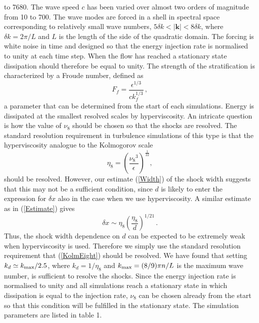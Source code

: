 \documentclass{jfm}
\newcommand{\kk}{\textbf{k}}
\newcommand{\kmax}{k_{\mbox{\scriptsize max}}}
\begin{document}
to 7680.
%
The wave speed $c$ has been varied over almost two orders of magnitude from 10
to 700. The wave modes are forced in a shell in spectral space corresponding to
relatively small wave numbers, $ 5 \delta k < |\kk| < 8 \delta k$, where $
\delta k = 2 \pi /L $ and $ L $ is the length of the side of the quadratic
domain. 
The forcing is white noise in time and designed so that the energy
injection rate is normalised to unity at each time step. When the flow has reached a stationary state dissipation should therefore be equal to unity. 
The strength of the stratification is characterized by a
Froude number, defined as
\begin{equation} \label{Fr}
F_f = \frac{\epsilon^{1/3}}{c k_f^{1/3}} \, ,
\end{equation}
a parameter that can be determined from the start of each simulations.
Energy is dissipated at the smallest resolved scales by hyperviscosity. An intricate question is how the value of $ \nu_{8} $ should be chosen so that the shocks are resolved. The standard resolution requirement in turbulence simulations of this type is that the hyperviscosity analogue to the Kolmogorov scale
\begin{equation}  \label{KolmEight}
\eta_{8} = \left( \frac{{\nu_8}^3}{\epsilon} \right)^{\frac{1}{22}},
\end{equation}
should be resolved. However, our estimate (\ref{Width}) of the shock width suggests that this may not be a sufficient condition, since $ d $ is likely to enter the expression for $ \delta x $ also in the case when we use hyperviscosity.
A similar estimate as in (\ref{Estimate}) gives
\begin{equation} \label{EtaEight}
\delta x \sim \eta_{8} \left ( \frac{\eta_8}{d} \right)^{1/21} \, .
\end{equation} 
Thus, the shock width dependence on $ d $ can be expected to be extremely weak when hyperviscosity is used. Therefore we simply use the standard resolution requirement that (\ref{KolmEight}) should be resolved. We have found that setting
$  k_{d} \simeq \kmax/ 2.5$, where $ k_{d} = 1/\eta_8 $ and $\kmax =
(8/9)\pi n/L $ is the maximum wave number, is  sufficient to resolve the shocks. Since the energy injection rate is normalised to unity and all simulations reach a stationary state in which dissipation is equal to the injection rate, $ \nu_8 $ can be chosen already from the start so that this condition will be fulfilled in the stationary state. 
 The  simulation parameters are listed in table 1.
\end{document}
